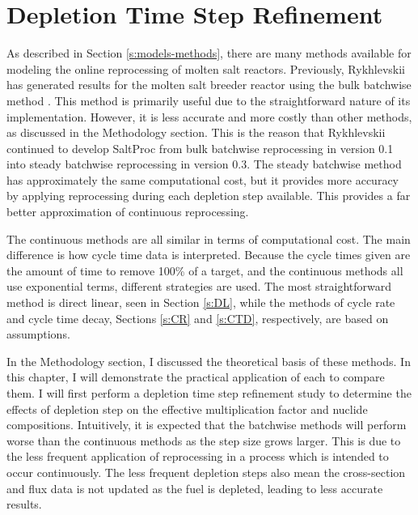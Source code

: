 \renewcommand*\descriptionlabel[1]{\hspace\leftmargin$#1$}
\setcounter{tocdepth}{5}
\setcounter{secnumdepth}{5}

\section{Depletion Time Step Refinement}
\label{s:dep-mesh}

As described in Section \ref{s:models-methods}, there are many methods available for modeling the online reprocessing of molten salt reactors.
Previously, Rykhlevskii has generated results for the molten salt breeder reactor using the bulk batchwise method \cite{rykhlevskii_advanced_2018}.
This method is primarily useful due to the straightforward nature of its implementation.
However, it is less accurate and more costly than other methods, as discussed in the Methodology section.
This is the reason that Rykhlevskii continued to develop SaltProc from bulk batchwise reprocessing in version 0.1 into steady batchwise reprocessing in version 0.3.
The steady batchwise method has approximately the same computational cost, but it provides more accuracy by applying reprocessing during each depletion step available.
This provides a far better approximation of continuous reprocessing.

The continuous methods are all similar in terms of computational cost.
The main difference is how cycle time data is interpreted.
Because the cycle times given are the amount of time to remove 100\% of a target, and the continuous methods all use exponential terms, different strategies are used.
The most straightforward method is direct linear, seen in Section \ref{s:DL}, while the methods of cycle rate and cycle time decay, Sections \ref{s:CR} and \ref{s:CTD}, respectively, are based on assumptions.

In the Methodology section, I discussed the theoretical basis of these methods.
In this chapter, I will demonstrate the practical application of each to compare them.
I will first perform a depletion time step refinement study to determine the effects of depletion step on the effective multiplication factor and nuclide compositions.
Intuitively, it is expected that the batchwise methods will perform worse than the continuous methods as the step size grows larger.
This is due to the less frequent application of reprocessing in a process which is intended to occur continuously.
The less frequent depletion steps also mean the cross-section and flux data is not updated as the fuel is depleted, leading to less accurate results.

